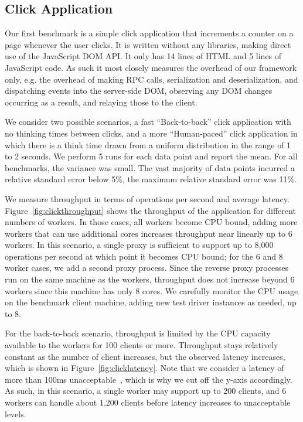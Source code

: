 %
%

\subsection{Click Application}
Our first benchmark is a simple click application that increments a counter on a page
whenever the user clicks.  It is written without any libraries, making direct use of
the JavaScript DOM API.  It only has 14 lines of HTML and 5 lines of JavaScript code.
As such it most closely measures the overhead of our
framework only, e.g. the overhead of making RPC calls, serialization and deserialization,
and dispatching events into the server-side DOM, observing any DOM changes occurring as
a result, and relaying those to the client.

We consider two possible scenarios, a fast ``Back-to-back'' click application 
with no thinking times between clicks, and a more ``Human-paced'' click application
in which there is a think time drawn from a uniform distribution in the range of
1 to 2 seconds.  We perform 5 runs for each data point and report the mean.
For all benchmarks, the variance was small. The vast majority of data points incurred
a relative standard error below 5\%, the maximum relative standard error was 11\%.

\clickthroughput{}
\clicklatency{}

We measure throughput in terms of operations per second and average latency.  
Figure~\ref{fig:clickthroughput} shows the throughput of the application for different
numbers of workers. In those cases, all workers become CPU bound, adding more workers
that can use additional cores increases throughput near linearly up to 6 workers. 
In this scenario, a single proxy is sufficient to support up to
8,000 operations per second at which point it becomes CPU bound;
for the 6 and 8 worker cases, we add a second proxy process.
Since the reverse proxy processes run on the same machine as the workers, throughput 
does not increase beyond 6 workers since this machine has only 8 cores.
We carefully monitor the CPU usage on the benchmark client machine, adding new
test driver instances as needed, up to 8.

\clickwaitthroughput{}
\clickwaitlatency{}

For the back-to-back scenario, throughput is limited by the CPU capacity available
to the workers for 100 clients or more.  Throughput stays relatively constant as
the number of client increases, but the observed latency increases, which is
shown in Figure~\ref{fig:clicklatency}.  Note that we consider a latency of more than
100ms unacceptable~\cite{Nielsen1993Usability}, which is why we cut off the y-axis
accordingly.  As such, in this scenario, a single worker may support up to 200 clients,
and 6 workers can handle about 1,200 clients before latency increases to unacceptable
levels. 

